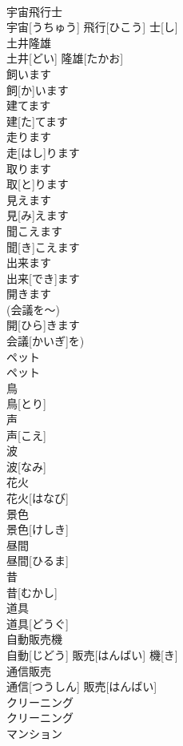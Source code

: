 \documentclass[8pt]{extreport}
\begin{document}
\begin{CJK}{UTF8}{min}
\\	宇宙飛行士	
\\	宇宙[うちゅう] 飛行[ひこう] 士[し]	
\\	土井隆雄	
\\	土井[どい] 隆雄[たかお]	
\\	飼います	
\\	飼[か]います	
\\	建てます	
\\	建[た]てます	
\\	走ります	
\\	走[はし]ります	
\\	取ります	
\\	取[と]ります	
\\	見えます	
\\	見[み]えます	
\\	聞こえます	
\\	聞[き]こえます	
\\	出来ます	
\\	出来[でき]ます	
\\	開きます
\\	(会議を～)
\\	開[ひら]きます
\\	会議[かいぎ]を)
\\	ペット	
\\	ペット	
\\	鳥	
\\	鳥[とり]	
\\	声	
\\	声[こえ]	
\\	波	
\\	波[なみ]	
\\	花火	
\\	花火[はなび]	
\\	景色	
\\	景色[けしき]	
\\	昼間	
\\	昼間[ひるま]	
\\	昔	
\\	昔[むかし]	
\\	道具	
\\	道具[どうぐ]	
\\	自動販売機	
\\	自動[じどう] 販売[はんばい] 機[き]	
\\	通信販売	
\\	通信[つうしん] 販売[はんばい]	
\\	クリーニング	
\\	クリーニング	
\\	マンション	

\end{CJK}
\end{document}
